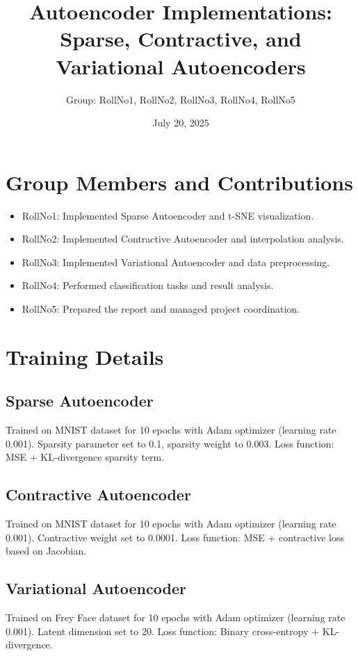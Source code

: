 \documentclass[a4paper,12pt]{article}
\begin{document}
\title{Autoencoder Implementations: Sparse, Contractive, and Variational Autoencoders}
\author{Group: RollNo1, RollNo2, RollNo3, RollNo4, RollNo5}
\date{July 20, 2025}
\maketitle

\section{Group Members and Contributions}
\begin{itemize}
    \item RollNo1: Implemented Sparse Autoencoder and t-SNE visualization.
    \item RollNo2: Implemented Contractive Autoencoder and interpolation analysis.
    \item RollNo3: Implemented Variational Autoencoder and data preprocessing.
    \item RollNo4: Performed classification tasks and result analysis.
    \item RollNo5: Prepared the report and managed project coordination.
\end{itemize}

\section{Training Details}
\subsection{Sparse Autoencoder}
Trained on MNIST dataset for 10 epochs with Adam optimizer (learning rate 0.001). Sparsity parameter set to 0.1, sparsity weight to 0.003. Loss function: MSE + KL-divergence sparsity term.

\subsection{Contractive Autoencoder}
Trained on MNIST dataset for 10 epochs with Adam optimizer (learning rate 0.001). Contractive weight set to 0.0001. Loss function: MSE + contractive loss based on Jacobian.

\subsection{Variational Autoencoder}
Trained on Frey Face dataset for 10 epochs with Adam optimizer (learning rate 0.001). Latent dimension set to 20. Loss function: Binary cross-entropy + KL-divergence.
\end{document}
